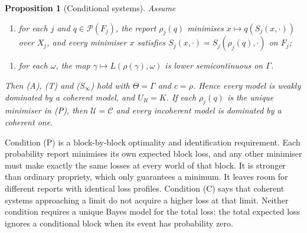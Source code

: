 \documentclass[11pt]{article}
\newtheorem{proposition}[theorem]{Proposition}
\theoremstyle{definition}
\theoremstyle{remark}
\newcommand{\C}{\mathcal C}
\newcommand{\U}{\mathcal U}
\newcommand{\PP}{\mathcal P}
\begin{document}
\begin{proposition}[Conditional systems]\label{prop:blocks}
Assume
\begin{enumerate}[label=\textbf{(P)},leftmargin=*]
\item for each $j$ and $q\in\PP(F_j)$, the report $\rho_j(q)$ minimises $x\mapsto q(S_j(x,\cdot))$ over $X_j$, and every minimiser $x$ satisfies $S_j(x,\cdot)=S_j(\rho_j(q),\cdot)$ on $F_j$;
\end{enumerate}
\begin{enumerate}[label=\textbf{(C)},leftmargin=*]
\item for each $\omega$, the map $\gamma\mapsto L(\rho(\gamma),\omega)$ is lower semicontinuous on $\Gamma$.
\end{enumerate}
Then (A), (T) and (S$_\infty$) hold with $\Theta=\Gamma$ and $c=\rho$. Hence every model is weakly dominated by a coherent model, and $U_R=K$. If each $\rho_j(q)$ is the \emph{unique} minimiser in (P), then $\U=\C$ and every incoherent model is dominated by a coherent one.
\end{proposition}

Condition (P) is a block-by-block optimality and identification requirement. Each probability report minimises its own expected block loss, and any other minimiser must make exactly the same losses at every world of that block. It is stronger than ordinary propriety, which only guarantees a minimum. It leaves room for different reports with identical loss profiles. Condition (C) says that coherent systems approaching a limit do not acquire a higher loss at that limit. Neither condition requires a unique Bayes model for the total loss: the total expected loss ignores a conditional block when its event has probability zero.
\end{document}
